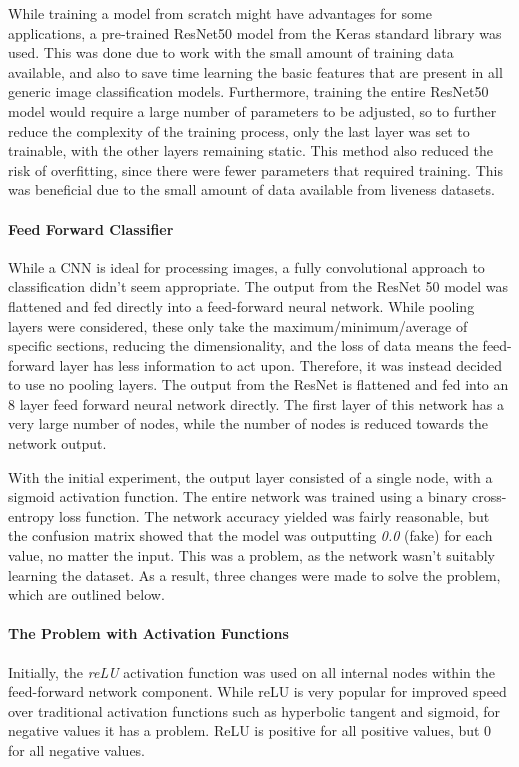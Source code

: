 \documentclass[10pt,a4paper]{article}
\begin{document}
                While training a model from scratch might have advantages for some applications, a pre-trained ResNet50 model from the Keras standard library was used. This was done due to work with the small amount of training data available, and also to save time learning the basic features that are present in all generic image classification models. Furthermore, training the entire ResNet50 model would require a large number of parameters to be adjusted, so to further reduce the complexity of the training process, only the last layer was set to trainable, with the other layers remaining static. This method also reduced the risk of overfitting, since there were fewer parameters that required training. This was beneficial due to the small amount of data available from liveness datasets.


                \paragraph{Feed Forward Classifier}
                While a CNN is ideal for processing images, a fully convolutional approach to classification didn't seem appropriate. The output from the ResNet 50 model was flattened and fed directly into a feed-forward neural network.
                While pooling layers were considered, these only take the maximum/minimum/average of specific sections, reducing the dimensionality, and the loss of data means the feed-forward layer has less information to act upon. Therefore,
                it was instead decided to use no pooling layers. The output from the ResNet is flattened and fed into an 8 layer feed forward neural network directly. The first layer of this network has a very large number of nodes,
                while the number of nodes is reduced towards the network output.
                
                With the initial experiment, the output layer consisted of a single node, with a sigmoid activation function. The entire network was trained using a binary cross-entropy loss function. The network accuracy yielded was fairly reasonable,
                but the confusion matrix showed that the model was outputting \emph{0.0} (fake) for each value, no matter the input. This was a problem, as the network wasn't suitably learning the dataset. As a result, three changes were made to solve the problem, which are outlined below.
                
                \paragraph{The Problem with Activation Functions}
                Initially, the \emph{reLU} activation function was used on all internal nodes within the feed-forward network component. While reLU is very popular for improved speed over traditional activation functions such as hyperbolic tangent and sigmoid,
                for negative values it has a problem. ReLU is positive for all positive values, but 0 for all negative values.
\end{document}
